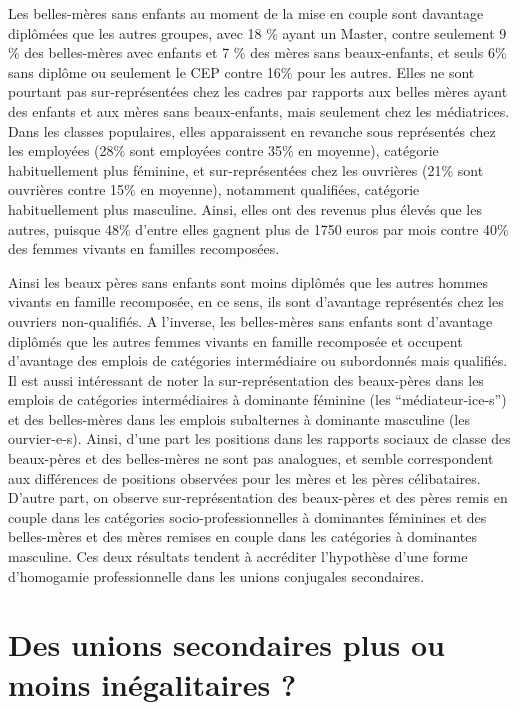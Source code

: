 \documentclass[
  12pt,
]{book}
\begin{document}
Les belles-mères sans enfants au moment de la mise en couple sont
davantage diplômées que les autres groupes, avec 18 \% ayant un Master,
contre seulement 9 \% des belles-mères avec enfants et 7 \% des mères
sans beaux-enfants, et seuls 6\% sans diplôme ou seulement le CEP contre
16\% pour les autres. Elles ne sont pourtant pas sur-représentées chez
les cadres par rapports aux belles mères ayant des enfants et aux mères
sans beaux-enfants, mais seulement chez les médiatrices. Dans les
classes populaires, elles apparaissent en revanche sous représentés chez
les employées (28\% sont employées contre 35\% en moyenne), catégorie
habituellement plus féminine, et sur-représentées chez les ouvrières
(21\% sont ouvrières contre 15\% en moyenne), notamment qualifiées,
catégorie habituellement plus masculine. Ainsi, elles ont des revenus
plus élevés que les autres, puisque 48\% d'entre elles gagnent plus de
1750 euros par mois contre 40\% des femmes vivants en familles
recomposées.

Ainsi les beaux pères sans enfants sont moins diplômés que les autres
hommes vivants en famille recomposée, en ce sens, ils sont d'avantage
représentés chez les ouvriers non-qualifiés. A l'inverse, les
belles-mères sans enfants sont d'avantage diplômés que les autres femmes
vivants en famille recomposée et occupent d'avantage des emplois de
catégories intermédiaire ou subordonnés mais qualifiés. Il est aussi
intéressant de noter la sur-représentation des beaux-pères dans les
emplois de catégories intermédiaires à dominante féminine (les
``médiateur-ice-s'') et des belles-mères dans les emplois subalternes à
dominante masculine (les ourvier-e-s). Ainsi, d'une part les positions
dans les rapports sociaux de classe des beaux-pères et des belles-mères
ne sont pas analogues, et semble correspondent aux différences de
positions observées pour les mères et les pères célibataires. D'autre
part, on observe sur-représentation des beaux-pères et des pères remis
en couple dans les catégories socio-professionnelles à dominantes
féminines et des belles-mères et des mères remises en couple dans les
catégories à dominantes masculine. Ces deux résultats tendent à
accréditer l'hypothèse d'une forme d'homogamie professionnelle dans les
unions conjugales secondaires.

\section{Des unions secondaires plus ou moins inégalitaires
?}\label{des-unions-secondaires-plus-ou-moins-inuxe9galitaires}
\end{document}
